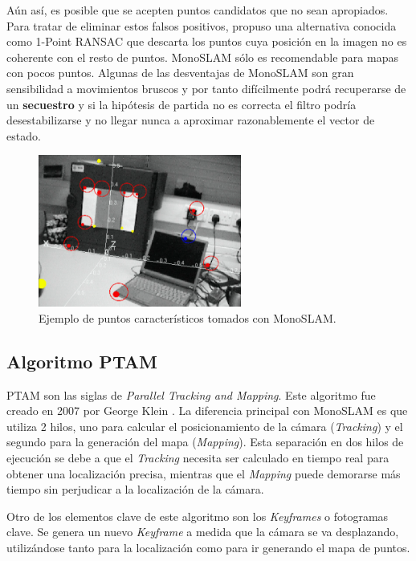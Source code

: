 Aún así, es posible que se acepten puntos candidatos que no sean apropiados. Para tratar de eliminar estos falsos positivos, \cite{civera20101} propuso una alternativa conocida como 1-Point RANSAC que descarta los puntos cuya posición en la imagen no es coherente con el resto de puntos.
MonoSLAM sólo es recomendable para mapas con pocos puntos. Algunas de las desventajas de MonoSLAM son 
 gran sensibilidad a movimientos bruscos y por tanto difícilmente podrá recuperarse de un \textbf{secuestro} y si la hipótesis de partida no es correcta el filtro podría desestabilizarse y no llegar nunca a aproximar razonablemente el vector de estado.


\begin{figure}[H]
\begin{center}
\includegraphics[height=5.0cm]{img/cap4/monoslam-300x225.png}
\end{center}
\caption{Ejemplo de puntos característicos tomados con MonoSLAM.}
\end{figure}
\clearpage


\subsection{Algoritmo PTAM}
PTAM son las siglas de \textit{Parallel Tracking and \textit{Mapping}}. Este algoritmo fue creado en 2007 por George Klein \cite{Klein2007parallel}. La diferencia principal con MonoSLAM es que utiliza 2 hilos, uno para calcular el posicionamiento de la cámara (\textit{Tracking}) y el segundo para la generación del mapa (\textit{Mapping}). Esta separación en dos hilos de ejecución se debe a que el \textit{Tracking} necesita ser calculado en tiempo real para obtener una localización precisa, mientras que el \textit{Mapping} puede demorarse más tiempo sin perjudicar a la localización de la cámara. 

Otro de los elementos clave de este algoritmo son los \textit{Keyframes} o fotogramas clave. Se genera un nuevo \textit{Keyframe} a medida que la cámara se va desplazando, utilizándose tanto para la localización como para ir generando el mapa de puntos.

